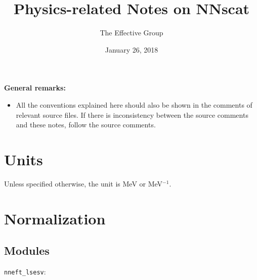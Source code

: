 \documentclass{article}
\begin{document}
\title{Physics-related Notes on NNscat}

\author{The Effective Group}

\date{January 26, 2018}

\maketitle

{\bf General remarks:}
\begin{itemize}
    \item All the conventions explained here should also be shown in the comments of relevant source files. If there is inconsistency between the source comments and these notes, follow the source comments.
\end{itemize}

\section{Units}
Unless specified otherwise, the unit is MeV or MeV$^{-1}$.

\section{Normalization}

\subsection{Modules}

\verb;nneft_lsesv;:
\end{document}
